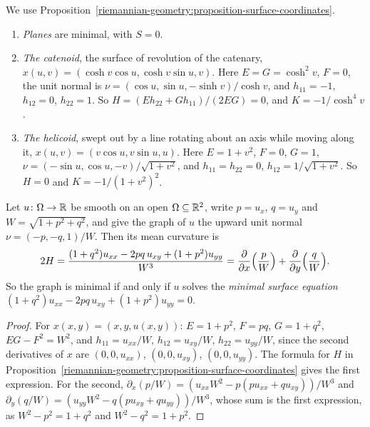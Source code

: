 \begin{example}\label{riemannian-geometry:example-minimal-surfaces}
We use Proposition~\ref{riemannian-geometry:proposition-surface-coordinates}.
\begin{enumerate}
\item \emph{Planes} are minimal, with $S = 0$.
\item \emph{The catenoid}, the surface of revolution of the catenary, $x(u, v) = (\cosh v\cos u, \cosh v\sin u, v)$. Here $E = G = \cosh^2v$, $F = 0$, the unit normal is
$\nu = (\cos u, \sin u, -\sinh v)/\cosh v$, and $h_{11} = -1$, $h_{12} = 0$, $h_{22} = 1$. So $H = (Eh_{22} + Gh_{11})/(2EG) = 0$, and $K = -1/\cosh^4v$.
\item \emph{The helicoid}, swept out by a line rotating about an axis while moving along it, $x(u, v) = (v\cos u, v\sin u, u)$. Here $E = 1 + v^2$, $F = 0$, $G = 1$,
$\nu = (-\sin u, \cos u, -v)/\sqrt{1 + v^2}$, and $h_{11} = h_{22} = 0$, $h_{12} = 1/\sqrt{1 + v^2}$. So $H = 0$ and $K = -1/(1 + v^2)^2$.
\end{enumerate}
\end{example}

\begin{proposition}\label{riemannian-geometry:proposition-minimal-surface-equation}
Let $u \colon \Omega \to \mathbb{R}$ be smooth on an open $\Omega \subseteq \mathbb{R}^2$, write $p = u_x$, $q = u_y$ and $W = \sqrt{1 + p^2 + q^2}$, and give the graph of $u$ the upward unit
normal $\nu = (-p, -q, 1)/W$. Then its mean curvature is
\[
2H = \frac{(1 + q^2)u_{xx} - 2pq\,u_{xy} + (1 + p^2)u_{yy}}{W^3} = \frac{\partial}{\partial x}\Bigl(\frac pW\Bigr) + \frac{\partial}{\partial y}\Bigl(\frac qW\Bigr).
\]
So the graph is minimal if and only if $u$ solves the \emph{minimal surface equation} $(1 + q^2)u_{xx} - 2pq\,u_{xy} + (1 + p^2)u_{yy} = 0$.
\end{proposition}

\begin{proof}
For $x(x, y) = (x, y, u(x, y))$: $E = 1 + p^2$, $F = pq$, $G = 1 + q^2$, $EG - F^2 = W^2$, and $h_{11} = u_{xx}/W$, $h_{12} = u_{xy}/W$, $h_{22} = u_{yy}/W$, since the second
derivatives of $x$ are $(0, 0, u_{xx})$, $(0, 0, u_{xy})$, $(0, 0, u_{yy})$. The formula for $H$ in
Proposition~\ref{riemannian-geometry:proposition-surface-coordinates} gives the first expression. For the second,
$\partial_x(p/W) = (u_{xx}W^2 - p(pu_{xx} + qu_{xy}))/W^3$ and $\partial_y(q/W) = (u_{yy}W^2 - q(pu_{xy} + qu_{yy}))/W^3$, whose sum is the first expression, as
$W^2 - p^2 = 1 + q^2$ and $W^2 - q^2 = 1 + p^2$.
\end{proof}

